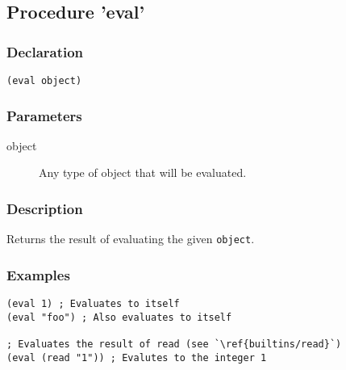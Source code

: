 \subsection{Procedure 'eval'}
\label{builtins/eval}

\subsubsection*{Declaration}
\begin{lstlisting}
(eval object)
\end{lstlisting}

\subsubsection*{Parameters}
\begin{description}
	\item[object] Any type of object that will be evaluated.
\end{description}

\subsubsection*{Description}
Returns the result of evaluating the given \lstinline|object|.

\subsubsection*{Examples}
\begin{lstlisting}[escapechar=`]
(eval 1) ; Evaluates to itself
(eval "foo") ; Also evaluates to itself

; Evaluates the result of read (see `\ref{builtins/read}`)
(eval (read "1")) ; Evalutes to the integer 1
\end{lstlisting}
